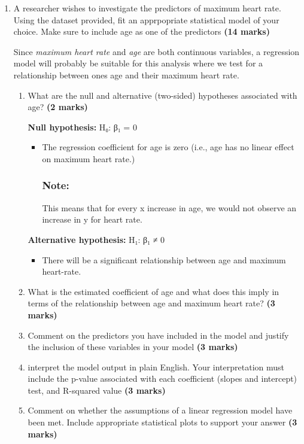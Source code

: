 \documentclass[
]{article}
\providecommand{\tightlist}{%
  \setlength{\itemsep}{0pt}\setlength{\parskip}{0pt}}
\begin{document}
\begin{enumerate}
\def\labelenumi{\arabic{enumi}.}
\setcounter{enumi}{2}
\item
  A researcher wishes to investigate the predictors of maximum heart
  rate. Using the dataset provided, fit an apprpopriate statistical
  model of your choice. Make sure to include age as one of the
  predictors \textbf{(14 marks)}

  Since \emph{maximum heart rate} and \emph{age} are both continuous
  variables, a regression model will probably be suitable for this
  analysis where we test for a relationship between ones age and their
  maximum heart rate.

  \begin{enumerate}
  \def\labelenumii{\alph{enumii})}
  \item
    What are the null and alternative (two-sided) hypotheses associated
    with age? \textbf{(2 marks)}

    \textbf{Null hypothesis:} H₀: β₁ = 0

    \begin{itemize}
    \item
      The regression coefficient for age is zero (i.e., age has no
      linear effect on maximum heart rate.)

      \subsubsection{Note:}\label{note}

      This means that for every x increase in age, we would not observe
      an increase in y for heart rate.
    \end{itemize}

    \textbf{Alternative hypothesis:} H₁: β₁ ≠ 0

    \begin{itemize}
    \tightlist
    \item
      There will be a significant relationship between age and maximum
      heart-rate.
    \end{itemize}
  \item
    What is the estimated coefficient of age and what does this imply in
    terms of the relationship between age and maximum heart rate?
    \textbf{(3 marks)}
  \item
    Comment on the predictors you have included in the model and justify
    the inclusion of these variables in your model \textbf{(3 marks)}
  \item
    interpret the model output in plain English. Your interpretation
    must include the p-value associated with each coefficient (slopes
    and intercept) test, and R-squared value \textbf{(3 marks)}
  \item
    Comment on whether the assumptions of a linear regression model have
    been met. Include appropriate statistical plots to support your
    answer \textbf{(3 marks)}
  \end{enumerate}
\end{enumerate}
\end{document}
